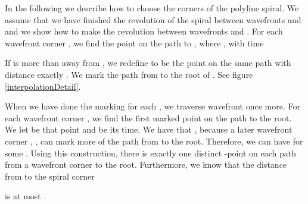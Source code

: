 \documentclass[3p]{elsarticle}
\begin{document}
In the following we describe how to choose the corners of the polyline spiral.
We assume that we have finished the revolution of the spiral between wavefronts  and
 and we show how to make the revolution between wavefronts  and .
For each wavefront corner , we find the point  on the path to
, where , with time

If  is more than  away from
, we redefine  to be the point on the same path
with distance exactly .
We mark the path from  to the root of .
See figure \ref{interpolationDetail}.

When we have done the marking for each , we traverse wavefront  once more.
For each wavefront corner ,
we find the first marked point on the path
to the root. We let  be that point and
 be its time. We have that , because
a later wavefront corner , , can mark more of the path from
 to the root. Therefore, we can have  for some .
Using this construction, there is exactly one distinct
-point on each path from a wavefront corner to the root.
Furthermore, we know that the distance from  to the spiral corner

is at most .

\begin{figure*}[h]
\centering
{}\quad
{}
\caption{ The interpolation between the two blue wavefronts. The boundary
 is in black and the diagram  is in gray. The red circles
are the points  and the marked part of of  is in black. The green crosses
are the resulting points of the polyline spiral stored in  after the convexification process.
 Related values for the same interpolation:
The points  are red circles.
The upper convex hull  of the points is a black curve, and the green crosses are the points
 on that hull.}
\label{interpolationDetail}
\end{figure*}
\end{document}
